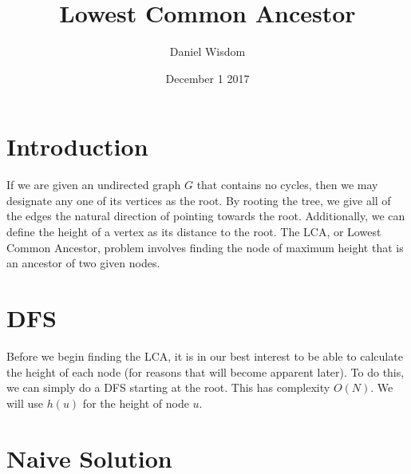 \documentclass{article}
\title{Lowest Common Ancestor}
\author{Daniel Wisdom}
\date{December 1 2017}
\begin{document}
\maketitle

\section{Introduction}
If we are given an undirected graph $G$ that contains no cycles, then we may designate any one of its vertices as the root. By rooting the tree, we give all of the edges the natural direction of pointing towards the root. Additionally, we can define the height of a vertex as its distance to the root. The LCA, or Lowest Common Ancestor, problem involves finding the node of maximum height that is an ancestor of two given nodes.  

\begin{figure}[H]
\centering
{}
\end{figure}


\section{DFS}

Before we begin finding the LCA, it is in our best interest to be able to calculate the height of each node (for reasons that will become apparent later). To do this, we can simply do a DFS starting at the root. This has complexity $O(N)$. We will use $h(u)$ for the height of node $u$.


\section {Naive Solution}
\end{document}
